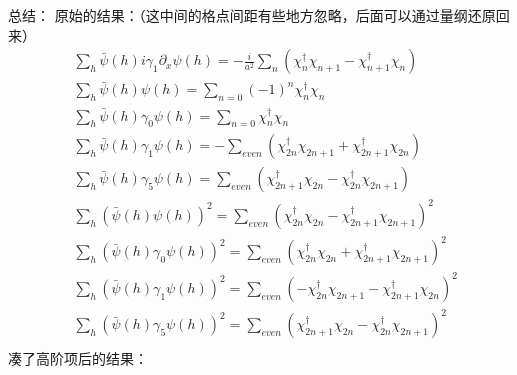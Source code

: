 总结：
原始的结果：（这中间的格点间距有些地方忽略，后面可以通过量纲还原回来）
\textcolor[rgb]{0,0,1}{
\begin{equation}
\begin{split}
&\sum _h \bar{\psi}(h)i\gamma _1\partial _x \psi(h) = -\frac{i}{a^2} \sum _n \left(\chi^{\dagger}_n\chi _{n+1} - \chi ^{\dagger}_{n+1}\chi _n\right)\\
&\sum _h \bar{\psi}(h) \psi(h) = \sum _{n=0} (-1)^n \chi^{\dagger} _n\chi _n\\
&\sum _h \bar{\psi}(h) \gamma _0 \psi(h) =\sum _{n=0} \chi^{\dagger} _n\chi _n\\
&\sum _h \bar{\psi}(h) \gamma _1 \psi(h) =-\sum _{even} \left(\chi ^{\dagger}_{2n}\chi _{2n+1}+\chi ^{\dagger}_{2n+1}\chi _{2n}\right)\\
&\sum _h \bar{\psi}(h) \gamma _5 \psi(h) =\sum _{even} \left(\chi ^{\dagger}_{2n+1}\chi _{2n} - \chi ^{\dagger}_{2n}\chi _{2n+1}\right)\\
&\sum _h (\bar{\psi}(h) \psi(h) )^2=\sum _{even}(\chi ^{\dagger}_{2n}\chi _{2n}-\chi ^{\dagger}_{2n+1}\chi _{2n+1})^2\\
&\sum _h (\bar{\psi}(h) \gamma _0 \psi(h) )^2=\sum _{even} (\chi ^{\dagger}_{2n}\chi _{2n}+\chi ^{\dagger}_{2n+1}\chi _{2n+1})^2\\
&\sum _h (\bar{\psi}(h) \gamma _1 \psi(h) )^2=\sum _{even}(-\chi ^{\dagger}_{2n}\chi _{2n+1}-\chi ^{\dagger}_{2n+1}\chi _{2n})^2\\
&\sum _h (\bar{\psi}(h) \gamma _5 \psi(h) )^2=\sum _{even}(\chi ^{\dagger}_{2n+1}\chi _{2n} - \chi ^{\dagger}_{2n}\chi _{2n+1})^2\\
\end{split}
\end{equation}
}
凑了高阶项后的结果：
